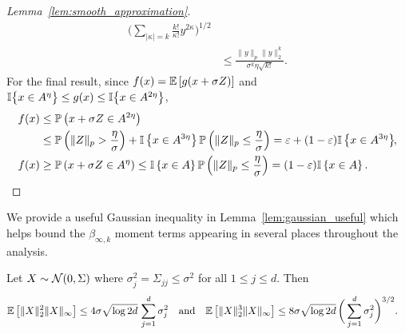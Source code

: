 \begin{proof}[Lemma~\ref{lem:smooth_approximation}]
\begin{align*}
    \Bigg(
      \sum_{|\kappa|=k}
      \frac{k!}{\kappa!}
      y^{2 \kappa}
    \Bigg)^{1/2} \\
    &\leq
    \frac{\|y\|_p \|y\|_2^k}{\sigma^k \eta \sqrt{k!}}.
  \end{align*}
  For the final result, since
  $f(x) = \mathbb{E} \left[ g(x + \sigma Z) \right]$ and
  $\mathbb{I}\big\{x \in A^\eta\big\}\leq g(x)\leq \mathbb{I}\big\{x \in A^{2\eta}\big\}$,
  \begin{align*}
    f(x)
    &\leq
    \mathbb{P} \left( x + \sigma Z \in A^{2 \eta} \right) \\
    &\leq
    \mathbb{P} \left( \|Z\|_p > \frac{\eta}{\sigma} \right)
    + \mathbb{I} \left\{ x \in A^{3 \eta} \right\}
    \mathbb{P} \left( \|Z\|_p \leq \frac{\eta}{\sigma} \right)
    = \varepsilon
    + (1 - \varepsilon) \mathbb{I} \left\{ x \in A^{3 \eta} \right\}
    \hspace*{-1mm}, \\
    f(x)
    &\geq
    \mathbb{P} \left( x + \sigma Z \in A^{\eta} \right)
    \leq
    \mathbb{I} \left\{ x \in A \right\}
    \mathbb{P} \left( \|Z\|_p \leq \frac{\eta}{\sigma} \right)
    = (1 - \varepsilon) \mathbb{I} \left\{ x \in A \right\}.
  \end{align*}
\end{proof}

We provide a useful Gaussian inequality in Lemma~\ref{lem:gaussian_useful}
which helps bound the $\beta_{\infty,k}$ moment terms appearing in several
places throughout the analysis.

\begin{lemma}%
  \label{lem:gaussian_useful}

  Let $X \sim \mathcal{N}(0, \Sigma)$
  where $\sigma_j^2 = \Sigma_{j j} \leq \sigma^2$ for all $1 \leq j \leq d$.
  Then
  \begin{align*}
    \mathbb{E}\left[
      \|X\|_2^2
      \|X\|_\infty
    \right]
    &\leq
    4 \sigma \sqrt{\log 2d}
    \,\sum_{j=1}^d \sigma_j^2
    &&\text{and}
    &\mathbb{E}\left[
      \|X\|_2^3
      \|X\|_\infty
    \right]
    &\leq
    8 \sigma \sqrt{\log 2d}
    \,\bigg( \sum_{j=1}^d \sigma_j^2 \bigg)^{3/2}.
  \end{align*}
\end{lemma}

